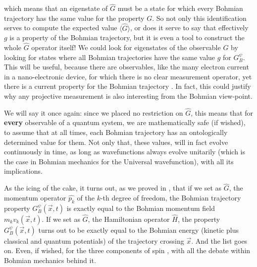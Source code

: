 \documentclass[11pt, a4paper]{article} %
\begin{document}
which means that an eigenstate of $\hat{G}$ must be a state for which every Bohmian trajectory has the same value for the property $G$. So not only this identification serves to compute the expected value $\langle \hat{G} \rangle$, or does it serve to say that effectively $g$ is a property of the Bohmian trajectory, but it is even a tool to construct the whole $\hat{G}$ operator itself! We could look for eigenstates of the observable $G$ by looking for states where all Bohmian trajectories have the same value $g$ for $G_B^\psi$. This will be useful, because there are observables, like the many electron current in a nano-electronic device, for which there is no clear measurement operator, yet there is a current property for the Bohmian trajectory \cite{Pel, equiv}. In fact, this could justify why any projective measurement is also interesting from the Bohmian view-point.

We will say it once again: since we placed no restriction on $\hat{G}$, this means that for {\bf every} observable of a quantum system, we are mathematically safe (if wished), to assume that at all times, each Bohmian trajectory has an ontologically determined value for them. Not only that, these values, will in fact evolve continuously in time, as long as wavefunctions always evolve unitarily (which is the case in Bohmian mechanics for the Universal wavefunction), with all its implications.

As the icing of the cake, it turns out, as we proved in \cite{DevInPosition1}, that if we set as $\hat{G}$, the momentum operator $\hat{p_k}$ of the $k$-th degree of freedom, the Bohmian trajectory property $G^\psi_B(\vec{x},t)$ is exactly equal to the Bohmian momentum field $m_k v_k(\vec{x},t)$. If we set as $\hat{G}$, the Hamiltonian operator $\hat{H}$, the property $G^\psi_B(\vec{x},t)$ turns out to be exactly equal to the Bohmian energy (kinetic plus classical and quantum potentials) of the trajectory crossing $\vec{x}$. And the list goes on. Even, if wished, for the three components of spin \cite{spin}, with all the debate within Bohmian mechanics behind it.
\end{document}
